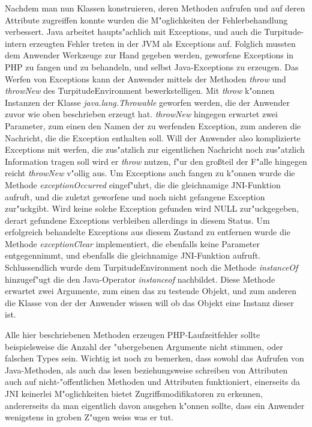 Nachdem man nun Klassen konstruieren, deren Methoden aufrufen und auf deren Attribute zugreiffen konnte wurden die M"oglichkeiten der Fehlerbehandlung
verbessert. Java arbeitet haupts"achlich mit Exceptions, und auch die Turpitude-intern erzeugten Fehler treten in der JVM als Exceptions auf. Folglich mussten dem
Anwender Werkzeuge zur Hand gegeben werden, geworfene Exceptions in PHP zu fangen und zu behandeln, und selbst Java-Exceptions zu erzeugen. Das Werfen von
Exceptions kann der Anwender mittels der Methoden \emph{throw} und \emph{throwNew} des TurpitudeEnvironment bewerkstelligen. Mit \emph{throw} k"onnen Instanzen
der Klasse \emph{java.lang.Throwable} geworfen werden, die der Anwender zuvor wie oben beschrieben erzeugt hat. \emph{throwNew} hingegen erwartet zwei Parameter,
zum einen den Namen der zu werfenden Exception, zum anderen die Nachricht, die die Exception enthalten soll. Will der Anwender also komplizierte Exceptions mit
werfen, die zus"atzlich zur eigentlichen Nachricht noch zus"atzlich Information tragen soll wird er \emph{throw} nutzen, f"ur den gro\ss teil der F"alle 
hingegen reicht \emph{throwNew} v"ollig aus. Um Exceptions auch fangen zu k"onnen wurde die Methode \emph{exceptionOccurred} eingef"uhrt, die die gleichnamige
JNI-Funktion aufruft, und die zuletzt geworfene und noch nicht gefangene Exception zur"uckgibt. Wird keine solche Exception gefunden wird NULL zur"uckgegeben,
derart gefundene Exceptions verbleiben allerdings in diesem Status. Um erfolgreich behandelte Exceptions aus diesem Zustand zu entfernen wurde die Methode
\emph{exceptionClear} implementiert, die ebenfalls keine Parameter entgegennimmt, und ebenfalls die gleichnamige JNI-Funktion aufruft.
Schlussendlich wurde dem TurpitudeEnvironment noch die Methode \emph{instanceOf} hinzugef"ugt die den Java-Operator \emph{instanceof} nachbildet.
Diese Methode erwartet zwei Argumente, zum einen das zu testende Objekt, und zum anderen die Klasse von der der Anwender wissen will ob das Objekt eine Instanz
dieser ist.

Alle hier beschriebenen Methoden erzeugen PHP-Laufzeitfehler sollte beispielsweise die Anzahl der "ubergebenen Argumente nicht stimmen, oder falschen Types sein.
Wichtig ist noch zu bemerken, dass sowohl das Aufrufen von Java-Methoden, als auch das lesen beziehungsweise schreiben von Attributen auch auf nicht-"offentlichen
Methoden und Attributen funktioniert, einerseits da JNI keinerlei M"oglichkeiten bietet Zugriffsmodifikatoren zu erkennen, andererseits da man eigentlich davon
ausgehen k"onnen sollte, dass ein Anwender wenigstens in groben Z"ugen weiss was er tut. 

